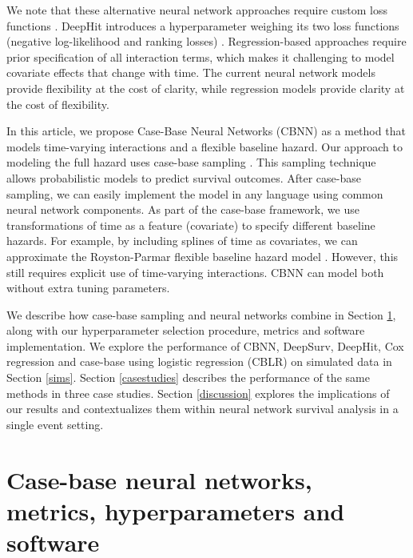 \documentclass[APA,LATO1COL]{WileyNJD-v2}
\begin{document}
We note that these alternative neural network approaches require custom loss functions
\citep{katzman2018DeepSurv} \citep{lee2018DeepHit}. DeepHit introduces a hyperparameter
weighing its two loss functions (negative log-likelihood and ranking losses) \citep{lee2018DeepHit}.
Regression-based approaches require prior specification of all interaction terms, which makes it
challenging to model covariate effects that change with time. The current neural network models
provide flexibility at the cost of clarity, while regression models provide clarity at the cost of flexibility.

In this article, we propose Case-Base Neural Networks (CBNN) as a method that models time-varying
interactions and a flexible baseline hazard. Our approach to modeling the full hazard uses case-base
sampling \citep{hanley2009}. This sampling technique allows probabilistic models to predict survival
outcomes. After case-base sampling, we can easily implement the model in any language using
common neural network components. As part of the case-base framework, we use transformations
of time as a feature (covariate) to specify different baseline hazards. For example, by including
splines of time as covariates, we can approximate the Royston-Parmar flexible baseline hazard model
\citep{royston2002flexible}\citep{hanley2009}. However, this still requires explicit use of time-varying
interactions. CBNN can model both without extra tuning parameters.

We describe how case-base sampling and neural networks combine
in Section \ref{methods}, along with our hyperparameter selection procedure, metrics and software implementation.
We explore the performance of CBNN, DeepSurv, DeepHit, Cox regression and case-base using logistic
regression (CBLR) on simulated data in Section \ref{sims}. Section \ref{casestudies} describes the
performance of the same methods in three case studies. Section \ref{discussion} explores the
implications of our results and contextualizes them within neural network survival analysis in a
single event setting.




\hypertarget{methods}{%
\section{Case-base neural networks, metrics, hyperparameters and
software}\label{methods}}
\end{document}

